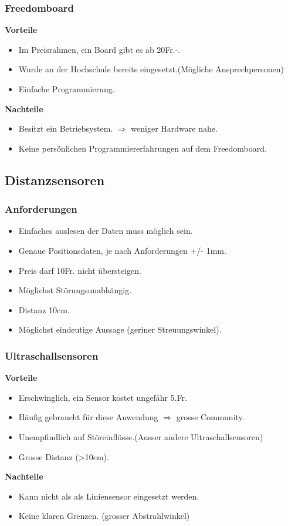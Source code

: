 \subsubsection{Freedomboard}
\textbf {Vorteile}
\begin{itemize}
\item Im Preisrahmen, ein Board gibt es ab 20Fr.-.
\item Wurde an der Hochschule bereits eingesetzt.(Mögliche Ansprechpersonen)
\item Einfache Programmierung.\\
\end{itemize}
\textbf {Nachteile}
\begin{itemize}
\item Besitzt ein Betriebsystem. $\Rightarrow$ weniger Hardware nahe.
\item Keine persönlichen Programmiererfahrungen auf dem Freedomboard.
\end{itemize}

\subsection*{Distanzsensoren}
\subsubsection{Anforderungen}
\begin{itemize}
\item Einfaches auslesen der Daten muss möglich sein.
\item Genaue Positionsdaten, je nach Anforderungen +/- 1mm.
\item Preis darf 10Fr. nicht übersteigen.
\item Möglichst Störungsunabhängig.
\item Distanz 10cm.
\item Möglichst eindeutige Aussage (geriner Streuungswinkel).
\end{itemize}

\subsubsection{Ultraschallsensoren}
\textbf {Vorteile}
\begin{itemize}
\item Erschwinglich, ein Sensor kostet ungefähr 5.Fr.
\item Häufig gebraucht für diese Anwendung $\Rightarrow$ grosse Community.
\item Unempfindlich auf Störeinflüsse.(Ausser andere Ultraschallsensoren)
\item Grosse Distanz (>10cm).\\
\end{itemize}
\textbf {Nachteile}
\begin{itemize}
\item Kann nicht als als Liniensensor eingesetzt werden.
\item Keine klaren Grenzen. (grosser Abstrahlwinkel)
\end{itemize}

